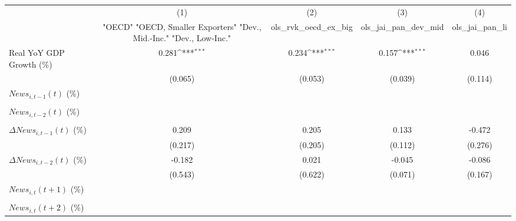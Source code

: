 {
\def\sym#1{\ifmmode^{#1}\else\(^{#1}\)\fi}
\begin{tabular}{l*{4}{c}}
\toprule
                    &\multicolumn{1}{c}{(1)}&\multicolumn{1}{c}{(2)}&\multicolumn{1}{c}{(3)}&\multicolumn{1}{c}{(4)}\\
                    &\multicolumn{1}{c}{ "OECD" "OECD, Smaller Exporters" "Dev., Mid.-Inc." "Dev., Low-Inc."}&\multicolumn{1}{c}{ols_rvk_oecd_ex_big}&\multicolumn{1}{c}{ols_jai_pan_dev_mid}&\multicolumn{1}{c}{ols_jai_pan_li}\\
\midrule
Real YoY GDP Growth (\%)&       0.281\sym{***}&       0.234\sym{***}&       0.157\sym{***}&       0.046         \\
                    &     (0.065)         &     (0.053)         &     (0.039)         &     (0.114)         \\
\addlinespace
$ News_{i,t-1}(t)$ (\%)&                     &                     &                     &                     \\
                    &                     &                     &                     &                     \\
\addlinespace
$ News_{i,t-2}(t)$ (\%)&                     &                     &                     &                     \\
                    &                     &                     &                     &                     \\
\addlinespace
$ \Delta News_{i,t-1}(t)$ (\%)&       0.209         &       0.205         &       0.133         &      -0.472         \\
                    &     (0.217)         &     (0.205)         &     (0.112)         &     (0.276)         \\
\addlinespace
$ \Delta News_{i,t-2}(t)$ (\%)&      -0.182         &       0.021         &      -0.045         &      -0.086         \\
                    &     (0.543)         &     (0.622)         &     (0.071)         &     (0.167)         \\
\addlinespace
$ News_{i,t}(t+1)$ (\%)&                     &                     &                     &                     \\
                    &                     &                     &                     &                     \\
\addlinespace
$ News_{i,t}(t+2)$ (\%)&                     &                     &                     &                     \\

\end{tabular}}
